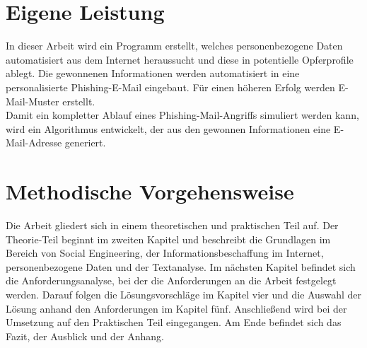 

 	
\section{Eigene Leistung}
\label {sec:Eigene Leistung} 
In dieser Arbeit wird ein Programm erstellt, welches personenbezogene Daten automatisiert aus dem Internet heraussucht und diese in potentielle Opferprofile ablegt. Die gewonnenen Informationen werden  automatisiert in eine personalisierte Phishing-E-Mail eingebaut. Für einen höheren Erfolg werden E-Mail-Muster erstellt.\\
Damit ein kompletter Ablauf eines Phishing-Mail-Angriffs simuliert werden kann, wird ein Algorithmus entwickelt, der aus den gewonnen Informationen eine E-Mail-Adresse generiert.

\section{Methodische Vorgehensweise}
\label {sec:Aufbau der Arbeit} 
Die Arbeit gliedert sich in einem theoretischen und praktischen Teil auf. Der Theorie-Teil beginnt im zweiten Kapitel und beschreibt die Grundlagen im Bereich von Social Engineering, der Informationsbeschaffung im Internet, personenbezogene Daten und der Textanalyse. Im nächsten Kapitel befindet sich die Anforderungsanalyse, bei der die Anforderungen an die Arbeit festgelegt werden. Darauf folgen die Lösungsvorschläge im Kapitel vier und die Auswahl der Lösung anhand den Anforderungen im Kapitel fünf. Anschließend wird bei der Umsetzung auf den Praktischen Teil eingegangen. Am Ende befindet sich das Fazit, der Ausblick und der Anhang.






